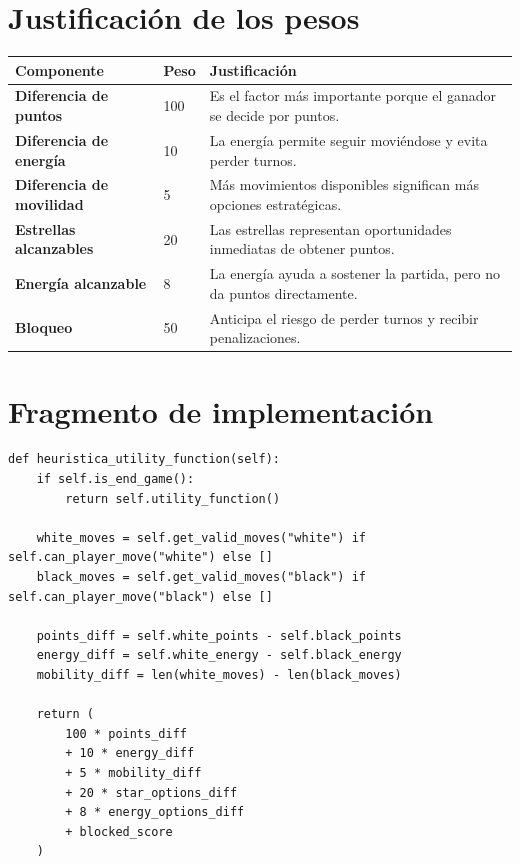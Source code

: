 \documentclass[12pt,letterpaper]{article}
\begin{document}
\section{Justificación de los pesos}

\begin{center}
\begin{tabular}{>{\bfseries}p{4.2cm}p{2.2cm}p{8cm}}
\toprule
Componente & Peso & Justificación\\
\midrule
Diferencia de puntos & 100 & Es el factor más importante porque el ganador se decide por puntos.\\
Diferencia de energía & 10 & La energía permite seguir moviéndose y evita perder turnos.\\
Diferencia de movilidad & 5 & Más movimientos disponibles significan más opciones estratégicas.\\
Estrellas alcanzables & 20 & Las estrellas representan oportunidades inmediatas de obtener puntos.\\
Energía alcanzable & 8 & La energía ayuda a sostener la partida, pero no da puntos directamente.\\
Bloqueo & 50 & Anticipa el riesgo de perder turnos y recibir penalizaciones.\\
\bottomrule
\end{tabular}
\end{center}

\section{Fragmento de implementación}

\begin{lstlisting}[style=kePython]
def heuristica_utility_function(self):
    if self.is_end_game():
        return self.utility_function()

    white_moves = self.get_valid_moves("white") if self.can_player_move("white") else []
    black_moves = self.get_valid_moves("black") if self.can_player_move("black") else []

    points_diff = self.white_points - self.black_points
    energy_diff = self.white_energy - self.black_energy
    mobility_diff = len(white_moves) - len(black_moves)

    return (
        100 * points_diff
        + 10 * energy_diff
        + 5 * mobility_diff
        + 20 * star_options_diff
        + 8 * energy_options_diff
        + blocked_score
    )
\end{lstlisting}
\end{document}

